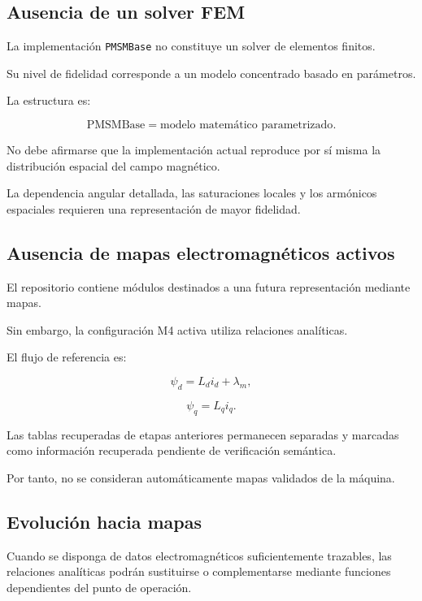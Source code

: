 \subsection{Ausencia de un solver FEM}

La implementación \texttt{PMSMBase} no constituye un solver de elementos finitos.

Su nivel de fidelidad corresponde a un modelo concentrado basado en parámetros.

La estructura es:

\begin{equation}
\text{PMSMBase}
=
\text{modelo matemático parametrizado}.
\end{equation}

No debe afirmarse que la implementación actual reproduce por sí misma la distribución espacial del campo magnético.

La dependencia angular detallada, las saturaciones locales y los armónicos espaciales requieren una representación de mayor fidelidad.

\subsection{Ausencia de mapas electromagnéticos activos}

El repositorio contiene módulos destinados a una futura representación mediante mapas.

Sin embargo, la configuración M4 activa utiliza relaciones analíticas.

El flujo de referencia es:

\begin{equation}
\psi_d=L_di_d+\lambda_m,
\end{equation}

\begin{equation}
\psi_q=L_qi_q.
\end{equation}

Las tablas recuperadas de etapas anteriores permanecen separadas y marcadas como información recuperada pendiente de verificación semántica.

Por tanto, no se consideran automáticamente mapas validados de la máquina.

\subsection{Evolución hacia mapas}

Cuando se disponga de datos electromagnéticos suficientemente trazables, las relaciones analíticas podrán sustituirse o complementarse mediante funciones dependientes del punto de operación.

